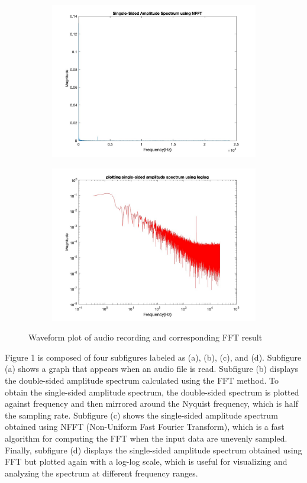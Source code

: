 \documentclass[
	a4paper,
	11pt,
]{article}
\begin{document}
\begin{figure}
\begin{subfigure}[t]{0.45\textwidth}
    \includegraphics[width=\linewidth]{A1/image3.jpg}
    \caption{}
    \label{fig:sub3}
  \end{subfigure}
  \hfill
  \begin{subfigure}[t]{0.45\textwidth}
    \centering
    \includegraphics[width=\linewidth]{A1/image4.jpg}
    \label{fig:sub4}
    \caption{}
  \end{subfigure}
  \caption{Waveform plot of audio recording and corresponding FFT result}
  \label{fig:example}
\end{figure}

Figure 1 is composed of four subfigures labeled as (a), (b), (c), and (d). Subfigure (a) shows a graph that appears when an audio file is read. Subfigure (b) displays the double-sided amplitude spectrum calculated using the FFT method. To obtain the single-sided amplitude spectrum, the double-sided spectrum is plotted against frequency and then mirrored around the Nyquist frequency, which is half the sampling rate. Subfigure (c) shows the single-sided amplitude spectrum obtained using NFFT (Non-Uniform Fast Fourier Transform), which is a fast algorithm for computing the FFT when the input data are unevenly sampled. Finally, subfigure (d) displays the single-sided amplitude spectrum obtained using FFT but plotted again with a log-log scale, which is useful for visualizing and analyzing the spectrum at different frequency ranges.
\end{document}
